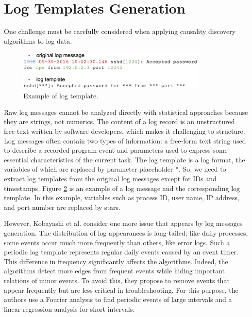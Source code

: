 \section{Log Templates Generation}
\label{sec:3}
One challenge must be carefully considered when applying causality discovery algorithms to log data.
\begin{figure}[h]
\centering
    \label{fig:log-template}
    \includegraphics[width=0.85\textwidth]{figures/log_template.png}
    \caption{Example of log template.}
\end{figure}
Raw log messages cannot be analyzed directly with statistical approaches because they are strings, not numerics. The content of a log record is an unstructured free-text written by software developers, which makes it challenging to structure. Log messages often contain two types of information: a free-form text string used to describe a recorded program event and parameters used to express some essential characteristics of the current task. The log template is a log format, the variables of which are replaced by parameter placeholder *. So, we need to extract log templates from the original log messages except for IDs and timestamps. Figure \hyperref[fig:log-template]{2} is an example of a log message and the corresponding log template. In this example, variables such as process ID, user name, IP address, and port number are replaced by stars.\newline

However, Kobayashi et al. \cite{jarry2021quantitative,kobayashi2017mining} consider one more issue that appears by log messages generation. The distribution of log appearances is long-tailed; like daily processes, some events occur much more frequently than others, like error logs. Such a periodic log template represents regular daily events caused by an event timer. This difference in frequency significantly affects the algorithms. Indeed, the algorithms detect more edges from frequent events while hiding important relations of minor events. To avoid this, they propose to remove events that appear frequently but are less critical in troubleshooting. For this purpose, the authors use a Fourier analysis to find periodic events of large intervals and a linear regression analysis for short intervals.\newline

